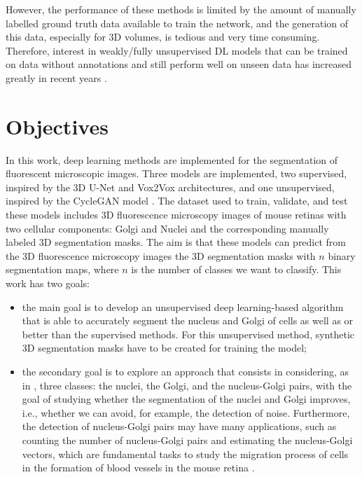 However, the performance of these methods is limited by the amount of manually labelled ground truth data available to train the network, and the generation of this data, especially for \ac{3D} volumes, is tedious and very time consuming. Therefore, interest in weakly/fully unsupervised \ac{DL} models that can be trained on data without annotations and still perform well on unseen data has increased greatly in recent years \cite{review:3}.



\section{Objectives}
\label{section:objectives}

In this work, deep learning methods are implemented for the segmentation of fluorescent microscopic images. Three models are implemented, two supervised, inspired by the \ac{3D} U-Net \cite{Unet:3D} and Vox2Vox \cite{isola2018imagetoimage} architectures, and one unsupervised, inspired by the CycleGAN model \cite{cycleGAN:original}. The dataset used to train, validate, and test these models includes \ac{3D} fluorescence microscopy images of mouse retinas with two cellular components: Golgi and Nuclei and the corresponding manually labeled \ac{3D} segmentation masks. The aim is that these models can predict from the \ac{3D} fluorescence microscopy images the \ac{3D} segmentation masks with $n$ binary segmentation maps, where $n$ is the number of classes we want to classify. This work has two goals:

\begin{itemize} 

\item the main goal is to develop an unsupervised deep learning-based algorithm that is able to accurately segment the nucleus and Golgi of cells as well as or better than the supervised methods. For this unsupervised method, synthetic \ac{3D} segmentation masks have to be created for training the model; 

\item the secondary goal is to explore an approach that consists in considering, as in \cite{nuclei&golgi}, three classes: the nuclei, the Golgi, and the nucleus-Golgi pairs, with the goal of studying whether the segmentation of the nuclei and Golgi improves, i.e., whether we can avoid, for example, the detection of noise. Furthermore, the detection of nucleus-Golgi pairs may have many applications, such as counting the number of nucleus-Golgi pairs and estimating the nucleus-Golgi vectors, which are fundamental tasks to study the migration process of cells in the formation of blood vessels in the mouse retina \cite{nuclei&golgi}.
\end{itemize}

